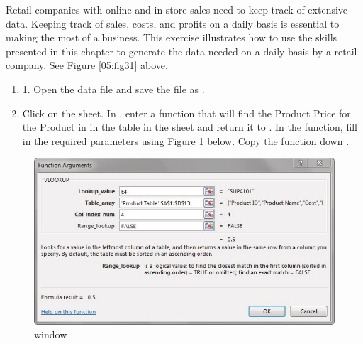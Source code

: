 Retail companies with online and in-store sales need to keep track of extensive data. Keeping track of sales, costs, and profits on a daily basis is essential to making the most of a business. This exercise illustrates how to use the skills presented in this chapter to generate the data needed on a daily basis by a retail company. See Figure \ref{05:fig31} above.

\begin{enumerate}
	\item 1. Open the data file  and save the file as .
	\item Click on the  sheet. In , enter a  function that will find the Product Price for the Product in  in the table in the  sheet and return it to . In the  function, fill in the required parameters using Figure \ref{05:fig32} below. Copy the  function down .
\end{enumerate}

\begin{figure}[H]
	\centering
	\includegraphics[width=\maxwidth{.95\linewidth}]{gfx/ch05_fig32}
	\caption{ window}
	\label{05:fig32}
\end{figure}

